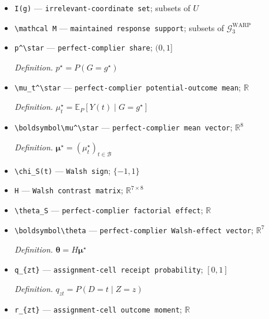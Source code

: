 \documentclass{article}
\begin{document}
\begin{itemize}
  \item \texttt{I(g)} --- \texttt{irrelevant-\allowbreak{}coordinate set}; subsets of \(U\)
  \item \texttt{\textbackslash{}\allowbreak{}mathcal M} --- \texttt{maintained response support}; subsets of \(\mathcal G^{\mathrm{WARP}}_3\)
  \item \texttt{p\textasciicircum{}\textbackslash{}\allowbreak{}star} --- \texttt{perfect-\allowbreak{}complier share}; \((0,1]\)
  \par\smallskip\noindent\emph{Definition.} \(p^\star=P(G=g^\star)\)
  \item \texttt{\textbackslash{}\allowbreak{}mu\_\allowbreak{}t\textasciicircum{}\textbackslash{}\allowbreak{}star} --- \texttt{perfect-\allowbreak{}complier potential-\allowbreak{}outcome mean}; \(\mathbb R\)
  \par\smallskip\noindent\emph{Definition.} \(\mu_t^\star=\mathbb E_P[Y(t)\mid G=g^\star]\)
  \item \texttt{\textbackslash{}\allowbreak{}boldsymbol\textbackslash{}\allowbreak{}mu\textasciicircum{}\textbackslash{}\allowbreak{}star} --- \texttt{perfect-\allowbreak{}complier mean vector}; \(\mathbb R^8\)
  \par\smallskip\noindent\emph{Definition.} \(\boldsymbol\mu^\star=(\mu_t^\star)_{t\in\mathcal B}\)
  \item \texttt{\textbackslash{}\allowbreak{}chi\_\allowbreak{}S(t)} --- \texttt{Walsh sign}; \(\{-1,1\}\)
  \item \texttt{H} --- \texttt{Walsh contrast matrix}; \(\mathbb R^{7\times8}\)
  \item \texttt{\textbackslash{}\allowbreak{}theta\_\allowbreak{}S} --- \texttt{perfect-\allowbreak{}complier factorial effect}; \(\mathbb R\)
  \item \texttt{\textbackslash{}\allowbreak{}boldsymbol\textbackslash{}\allowbreak{}theta} --- \texttt{perfect-\allowbreak{}complier Walsh-\allowbreak{}effect vector}; \(\mathbb R^7\)
  \par\smallskip\noindent\emph{Definition.} \(\boldsymbol\theta=H\boldsymbol\mu^\star\)
  \item \texttt{q\_\allowbreak{}\{zt\}\allowbreak{}} --- \texttt{assignment-\allowbreak{}cell receipt probability}; \([0,1]\)
  \par\smallskip\noindent\emph{Definition.} \(q_{zt}=P(D=t\mid Z=z)\)
  \item \texttt{r\_\allowbreak{}\{zt\}\allowbreak{}} --- \texttt{assignment-\allowbreak{}cell outcome moment}; \(\mathbb R\)

\end{itemize}
\end{document}

